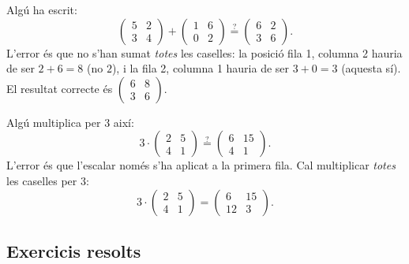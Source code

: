\begin{exemple}
Algú ha escrit:
\[
\begin{pmatrix} 5 & 2 \\ 3 & 4 \end{pmatrix}+\begin{pmatrix} 1 & 6 \\ 0 & 2 \end{pmatrix}
\overset{?}{=}\begin{pmatrix} 6 & 2 \\ 3 & 6 \end{pmatrix}.
\]
L'error és que no s'han sumat \emph{totes} les caselles: la posició fila 1,
columna 2 hauria de ser $2+6=8$ (no $2$), i la fila 2, columna 1 hauria de ser
$3+0=3$ (aquesta sí). El resultat correcte és
$\begin{pmatrix} 6 & 8 \\ 3 & 6 \end{pmatrix}$.
\end{exemple}

\begin{exemple}
Algú multiplica per $3$ així:
\[
3\cdot\begin{pmatrix} 2 & 5 \\ 4 & 1 \end{pmatrix}
\overset{?}{=}\begin{pmatrix} 6 & 15 \\ 4 & 1 \end{pmatrix}.
\]
L'error és que l'escalar només s'ha aplicat a la primera fila. Cal multiplicar
\emph{totes} les caselles per $3$:
\[
3\cdot\begin{pmatrix} 2 & 5 \\ 4 & 1 \end{pmatrix}=\begin{pmatrix} 6 & 15 \\ 12 & 3 \end{pmatrix}.
\]
\end{exemple}

\subsection{Exercicis resolts}

